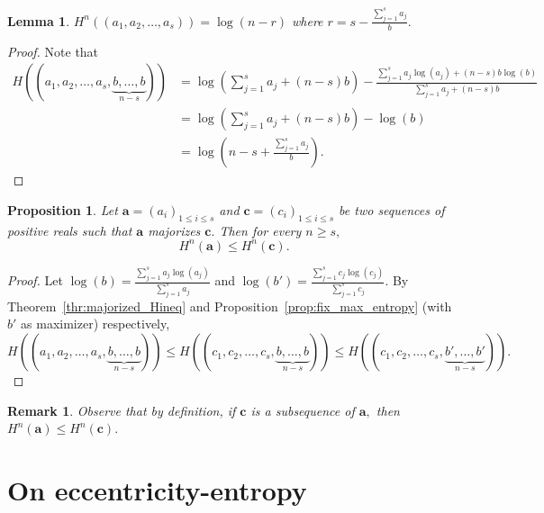 \documentclass{article}
\newtheorem{lem}[defi]{Lemma}
\newtheorem{prop}[defi]{Proposition}
\newtheorem{remark}[defi]{Remark}
\begin{document}
{\begin{lem}\label{lem:log(n-r)}
    $H^n((a_1,a_2, \ldots, a_s))= \log(n-r)$ where $r= s- \frac{ \sum_{j=1}^s a_j}{b}.$
\end{lem}
    
\begin{proof}
    Note that 
    \begin{align*}
        H\left((a_1,a_2, \ldots, a_s,\underbrace{b, \ldots, b}_{n-s}) \right)&=
        \log\left( \sum_{j=1}^s a_j + (n-s) b\right) - \frac{ \sum_{j=1}^s a_j \log(a_j) + (n-s) b \log(b)}{\sum_{j=1}^s a_j + (n-s) b}\\
        &= \log\left( \sum_{j=1}^s a_j + (n-s) b\right) - \log(b)\\
        &= \log\left(n-s+\frac{\sum_{j=1}^s a_j}{b} \right).
    \end{align*}
\end{proof}



\begin{prop}\label{prop:majorizesHineq}
    Let $\mathbf{a}=(a_i)_{1 \le i \le s}$ and $\mathbf{c}=(c_i)_{1 \le i \le s}$ be two sequences of positive reals such that $\mathbf{a}$ majorizes $\mathbf{c}.$
    Then for every $n \ge s,$ $$H^n(\mathbf{a})\le H^n(\mathbf{c}).$$
\end{prop}

\begin{proof}
    Let $\log(b) = \frac{ \sum_{j=1}^s a_j \log(a_j) }{ \sum_{j=1}^s a_j }$ and $\log(b') = \frac{ \sum_{j=1}^s c_j \log(c_j) }{ \sum_{j=1}^s c_j }.$
    By Theorem~\ref{thr:majorized_Hineq} and Proposition~\ref{prop:fix_max_entropy} (with $b'$ as maximizer) respectively, $$H\left((a_1,a_2, \ldots, a_s,\underbrace{b, \ldots, b}_{n-s} )\right) \le H\left((c_1,c_2, \ldots, c_s,\underbrace{b, \ldots, b}_{n-s}) \right) \le H\left((c_1,c_2, \ldots, c_s,\underbrace{b', \ldots, b'}_{n-s} )\right).$$
\end{proof}

\begin{remark}\label{rem:H^n_larger_subset}
    Observe that by definition, if $\mathbf{c}$ is a subsequence of $\mathbf{a},$ then $H^n(\mathbf{a})\le H^n(\mathbf{c}).$
\end{remark}






\section{On eccentricity-entropy}\label{sec:Iecc}

}
\end{document}
